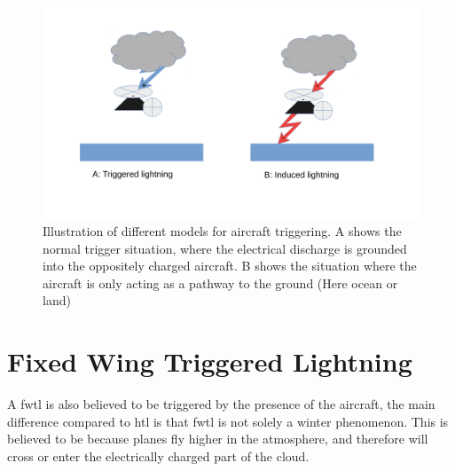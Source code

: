 \begin{figure}
    \centering
    \includegraphics[width=\textwidth]{Figures/triggertyper.pdf}
    \caption{Illustration of different models for aircraft triggering. A shows the normal trigger situation, where the electrical discharge is grounded into the oppositely charged aircraft. B shows the situation where the aircraft is only acting as a pathway to the ground (Here ocean or land)}
    \label{fig:triggertyper}
\end{figure}

\section{Fixed Wing Triggered Lightning}

A \acrlong{fwtl} is also believed to be triggered by the presence of the aircraft, the main difference compared to \acrshort{htl} is that \acrshort{fwtl} is not solely a winter phenomenon. This is believed to be because planes fly higher in the atmosphere, and therefore will cross or enter the electrically charged part of the cloud.



